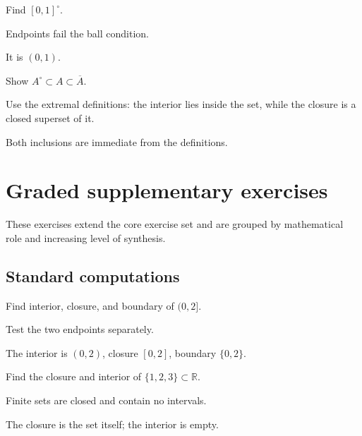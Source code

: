 \begin{exercise}\label{exr:ii04-07}
Find $[0,1]^\circ$.
\end{exercise}
\begin{hint}
Endpoints fail the ball condition.
\end{hint}
\begin{solution}
It is $(0,1)$.
\end{solution}

\begin{exercise}\label{exr:ii04-08}
Show $A^\circ\subset A\subset\overline A$.
\end{exercise}
\begin{hint}
Use the extremal definitions: the interior lies inside the set, while the closure is a closed superset of it.
\end{hint}
\begin{solution}
Both inclusions are immediate from the definitions.
\end{solution}


\section{Graded supplementary exercises}
These exercises extend the core exercise set and are grouped by mathematical role and increasing level of synthesis.

\subsection*{Standard computations}

\begin{exercise}\label{exr:ii04-expand-01}
Find interior, closure, and boundary of \((0,2]\).
\end{exercise}
\begin{hint}
Test the two endpoints separately.
\end{hint}
\begin{solution}
The interior is \((0,2)\), closure \([0,2]\), boundary \(\{0,2\}\).
\end{solution}

\begin{exercise}\label{exr:ii04-expand-02}
Find the closure and interior of \(\{1,2,3\}\subset\mathbb R\).
\end{exercise}
\begin{hint}
Finite sets are closed and contain no intervals.
\end{hint}
\begin{solution}
The closure is the set itself; the interior is empty.
\end{solution}

